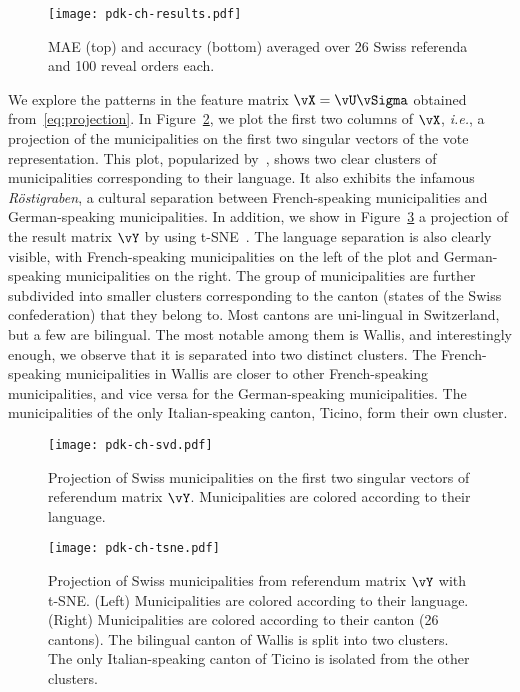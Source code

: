 \begin{figure}
	\texttt{[image: pdk-ch-results.pdf]}
	\caption{MAE (top) and accuracy (bottom) averaged over 26 Swiss referenda and 100 reveal orders each.}
	\label{fig:ch_results}
\end{figure}

We explore the patterns in the feature matrix $\vX = \vU \vSigma$ obtained from~\eqref{eq:projection}.
In Figure~\ref{fig:ch_svd}, we plot the first two columns of $\vX$, \textit{i.e.}, a projection of the municipalities on the first two singular vectors of the vote representation.
This plot, popularized by~\citet{etter2014mining}, shows two clear clusters of municipalities corresponding to their language.
It also exhibits the infamous \textit{Röstigraben}, a cultural separation between French-speaking municipalities and German-speaking municipalities.
In addition, we show in Figure~\ref{fig:ch_tsne} a projection of the result matrix $\vY$ by using t-SNE~\citep{maaten2008visualizing}.
The language separation is also clearly visible, with French-speaking municipalities on the left of the plot and German-speaking municipalities on the right.
The group of municipalities are further subdivided into smaller clusters corresponding to the canton (states of the Swiss confederation) that they belong to.
Most cantons are uni-lingual in Switzerland, but a few are bilingual.
The most notable among them is Wallis, and interestingly enough, we observe that it is separated into two distinct clusters.
The French-speaking municipalities in Wallis are closer to other French-speaking municipalities, and vice versa for the German-speaking municipalities.
The municipalities of the only Italian-speaking canton, Ticino, form their own cluster.

\begin{figure}
	\texttt{[image: pdk-ch-svd.pdf]}
	\caption{
		Projection of Swiss municipalities on the first two singular vectors of referendum matrix $\vY$.
		Municipalities are colored according to their language.
	}
	\label{fig:ch_svd}
\end{figure}

\begin{figure}
	\texttt{[image: pdk-ch-tsne.pdf]}
	\caption{
		Projection of Swiss municipalities from referendum matrix $\vY$ with t-SNE.
		(Left) Municipalities are colored according to their language.
		(Right) Municipalities are colored according to their canton (26 cantons).
		The bilingual canton of Wallis is split into two clusters.
		The only Italian-speaking canton of Ticino is isolated from the other clusters.
	}
	\label{fig:ch_tsne}
\end{figure}


